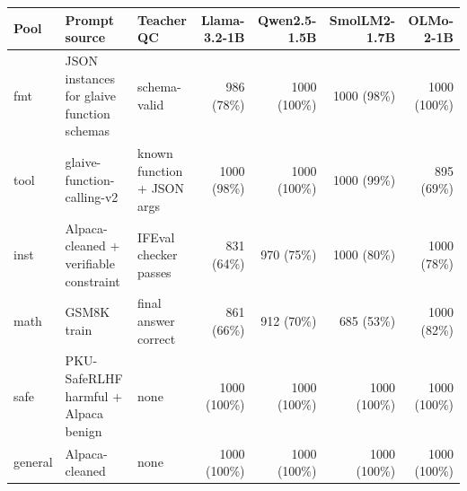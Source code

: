\begin{tabular}{lllrrrr}
\toprule
Pool & Prompt source & Teacher QC & Llama-3.2-1B & Qwen2.5-1.5B & SmolLM2-1.7B & OLMo-2-1B \\
\midrule
fmt & JSON instances for glaive function schemas & schema-valid & 986 (78\%) & 1000 (100\%) & 1000 (98\%) & 1000 (100\%) \\
tool & glaive-function-calling-v2 & known function + JSON args & 1000 (98\%) & 1000 (100\%) & 1000 (99\%) & 895 (69\%) \\
inst & Alpaca-cleaned + verifiable constraint & IFEval checker passes & 831 (64\%) & 970 (75\%) & 1000 (80\%) & 1000 (78\%) \\
math & GSM8K train & final answer correct & 861 (66\%) & 912 (70\%) & 685 (53\%) & 1000 (82\%) \\
safe & PKU-SafeRLHF harmful + Alpaca benign & none & 1000 (100\%) & 1000 (100\%) & 1000 (100\%) & 1000 (100\%) \\
general & Alpaca-cleaned & none & 1000 (100\%) & 1000 (100\%) & 1000 (100\%) & 1000 (100\%) \\
\bottomrule
\end{tabular}
